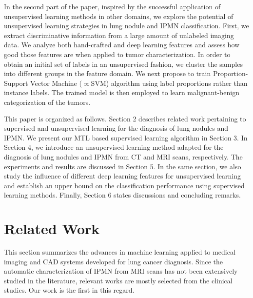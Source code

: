 \documentclass[journal]{IEEEtran}
\begin{document}
In the second part of the paper, inspired by the successful application of unsupervised learning methods in other domains, we explore the potential of unsupervised learning strategies in lung nodule and IPMN classification. First, we extract discriminative information from a large amount of unlabeled imaging data. We analyze both hand-crafted and deep learning features and assess how good those features are when applied to tumor characterization. In order to obtain an initial set of labels in an unsupervised fashion, we cluster the samples into different groups in the feature domain. We next propose to train Proportion-Support Vector Machine ($\propto$SVM) algorithm using label proportions rather than instance labels. The trained model is then employed to learn malignant-benign categorization of the tumors.

This paper is organized as follows. Section 2 describes related work pertaining to supervised and unsupervised learning for the diagnosis of lung nodules and IPMN. We present our MTL based supervised learning algorithm in Section 3. In Section 4, we introduce an unsupervised learning method adapted for the diagnosis of lung nodules and IPMN from CT and MRI scans, respectively. The experiments and results are discussed in Section 5. In the same section, we also study the influence of different deep learning features for unsupervised learning and establish an upper bound on the classification performance using supervised learning methods. Finally, Section 6 states discussions and concluding remarks.

\section{Related Work}
This section summarizes the advances in machine learning applied to medical imaging and CAD systems developed for lung cancer diagnosis. Since the automatic characterization of IPMN from MRI scans has not been extensively studied in the literature, relevant works are mostly selected from the clinical studies. Our work is the first in this regard.\\
\end{document}
